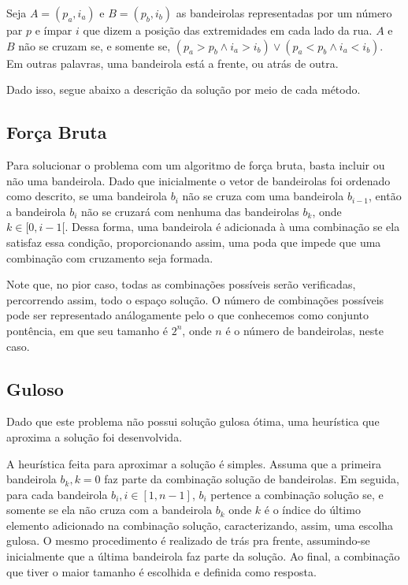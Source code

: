 \documentclass[
	12pt,
	a4paper,
	onepage,
	brazil
]{article}
\begin{document}
	Seja $A = (p_a, i_a)$ e $B = (p_b, i_b)$ as bandeirolas representadas por um número par $p$ e ímpar $i$ que dizem a posição das extremidades em cada lado da rua. $A$ e $B$ não se cruzam se, e somente se, $(p_a > p_b \land i_a > i_b) \lor (p_a < p_b \land i_a < i_b)$. Em outras palavras, uma bandeirola está a frente, ou atrás de outra.
	
	Dado isso, segue abaixo a descrição da solução por meio de cada método.
	
	\subsection{Força Bruta}
	
	Para solucionar o problema com um algoritmo de força bruta, basta incluir ou não uma bandeirola. Dado que inicialmente o vetor de bandeirolas foi ordenado como descrito, se uma bandeirola $b_i$ não se cruza com uma bandeirola $b_{i-1}$, então a bandeirola $b_i$ não se cruzará com nenhuma das bandeirolas $b_k$, onde $k \in [0, i-1[$. Dessa forma, uma bandeirola é adicionada à uma combinação se ela satisfaz essa condição, proporcionando assim, uma poda que impede que uma combinação com cruzamento seja formada.
	
	Note que, no pior caso, todas as combinações possíveis serão verificadas, percorrendo assim, todo o espaço solução. O número de combinações possíveis pode ser representado análogamente pelo o que conhecemos como conjunto pontência, em que seu tamanho é $2^n$, onde $n$ é o número de bandeirolas, neste caso.
	
	\subsection{Guloso}
	
	Dado que este problema não possui solução gulosa ótima, uma heurística que aproxima a solução foi desenvolvida.
	
	A heurística feita para aproximar a solução é simples. Assuma que a primeira bandeirola $b_k, k = 0$ faz parte da combinação solução de bandeirolas. Em seguida, para cada bandeirola $b_i, i \in [1, n-1]$, $b_i$ pertence a combinação solução se, e somente se ela não cruza com a bandeirola $b_k$ onde $k$ é o índice do último elemento adicionado na combinação solução, caracterizando, assim, uma escolha gulosa. O mesmo procedimento é realizado de trás pra frente, assumindo-se inicialmente que a última bandeirola faz parte da solução. Ao final, a combinação que tiver o maior tamanho é escolhida e definida como resposta.
	
\end{document}
